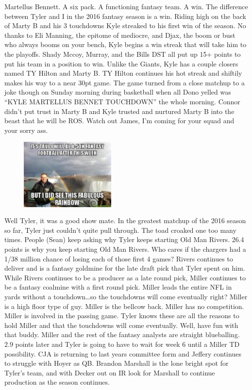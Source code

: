 \documentclass[11pt,letterpaper]{article}
\begin{document}
\par\noindent Martellus Bennett. A six pack. A functioning fantasy team. A win. The difference between Tyler and I in the 2016 fantasy season is a win. Riding high on the back of Marty B and his 3 touchdowns Kyle streaked to his first win of the season. No thanks to Eli Manning, the epitome of mediocre, and Djax, the boom or bust who always booms on your bench, Kyle begins a win streak that will take him to the playoffs. Shady Mccoy, Murray, and the Bills DST all put up 15+ points to put his team in a position to win. Unlike the Giants, Kyle has a couple closers named TY Hilton and Marty B. TY Hilton continues his hot streak and shiftily makes his way to a near 30pt game. The game turned from a close matchup to a joke though on Sunday morning during basketball when all Dono yelled was ``KYLE MARTELLUS BENNET TOUCHDOWN'' the whole morning. Connor didn't put trust in Marty B and Kyle trusted and nurtured Marty B into the beast that he will be ROS. Watch out James, I'm coming for your squad and your sorry ass.
\begin{figure}
\centering
\includegraphics[width=0.425\textwidth]{week5-rainbows.png}
\label{fig:week5-rainbows}
\end{figure}
\bigskip
\par\noindent Well Tyler, it was a good show mate. In the greatest matchup of the 2016 season so far, Tyler just couldn't quite pull through. The toad croaked one too many times. People (Sean) keep asking why Tyler keeps starting Old Man Rivers. 26.4 points is why you keep starting Old Man Rivers. Who cares if the chargers had a 1/38 million chance of losing each of those first 4 games? Rivers continues to deliver and is a fantasy goldmine for the late draft pick that Tyler spent on him. While Rivers continues to be a producer as a late round pick, Miller continues to be a fantasy coalmine with a first round pick. Miller leads the entire NFL in yards without a touchdown\dots so the touchdowns will come eventually right? Miller is a high floor type of guy. Miller is the bellcow back. Miller has no competition. Miller is involved in the passing game. Tyler knows these are all the reasons to hold Miller and that the touchdowns will come eventually. Well, have fun with that buddy. Miller and the rest of the fantasy analysts are straight blueballing. 2.9 points later and Tyler is going to have to wait for week 6 until a Miller TD possibility. CJA is returning to last years committee form and Jeffery continues to struggle with Hoyer as QB. Brandon Marshall is the lone bright spot for Tyler's team, and with Decker out on IR look for Marshall to continue production as the season continues.
\end{document}
